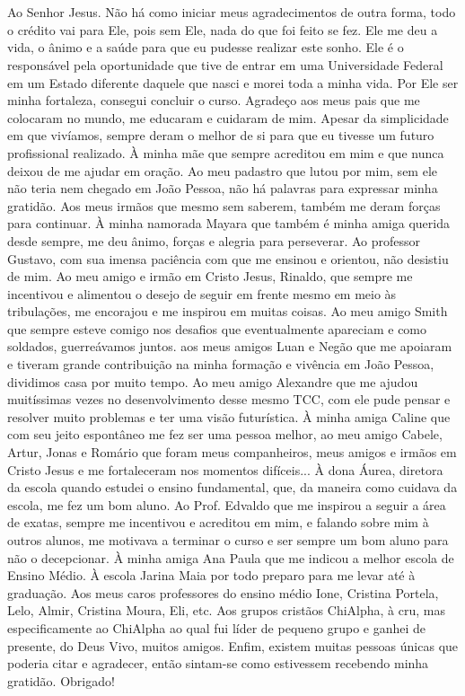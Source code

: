 
\section*{}

Ao Senhor Jesus. Não há como iniciar meus agradecimentos de outra forma, todo o crédito vai para Ele, pois sem Ele, nada do que foi feito se fez. Ele me deu a vida, o ânimo e a saúde para que eu pudesse realizar este sonho. Ele é o responsável pela oportunidade que tive de entrar em uma Universidade Federal em um Estado diferente daquele que nasci e morei toda a minha vida. Por Ele ser minha fortaleza, consegui concluir o curso.
Agradeço aos meus pais que me colocaram no mundo, me educaram e cuidaram de mim. Apesar da simplicidade em que vivíamos, sempre deram o melhor de si para que eu tivesse um futuro profissional realizado. À minha mãe que sempre acreditou em mim e que nunca deixou de me ajudar em oração. Ao meu padastro que lutou por mim, sem ele não teria nem chegado em João Pessoa, não há palavras para expressar minha gratidão. Aos meus irmãos que mesmo sem saberem, também me deram forças para continuar. À minha namorada Mayara que também é minha amiga querida desde sempre, me deu ânimo, forças e alegria para perseverar.
Ao professor Gustavo, com sua imensa paciência com que me ensinou e orientou, não desistiu de mim.
Ao meu amigo e irmão em Cristo Jesus, Rinaldo, que sempre me incentivou e alimentou o desejo de seguir em frente mesmo em meio às tribulações, me encorajou e me inspirou em muitas coisas.
Ao meu amigo Smith que sempre esteve comigo nos desafios que eventualmente apareciam e como soldados, guerreávamos juntos.
aos meus amigos Luan e Negão que me apoiaram e tiveram grande contribuição na minha formação e vivência em João Pessoa, dividimos casa por muito tempo.
Ao meu amigo Alexandre que me ajudou muitíssimas vezes no desenvolvimento desse mesmo TCC, com ele pude pensar e resolver muito problemas e ter uma visão futurística.
À minha amiga Caline que com seu jeito espontâneo me fez ser uma pessoa melhor, ao meu amigo Cabele, Artur, Jonas e Romário que foram meus companheiros, meus amigos e irmãos em Cristo Jesus e me fortaleceram nos momentos difíceis...
À dona Áurea, diretora da escola quando estudei o ensino fundamental, que, da maneira como cuidava da escola, me fez um bom aluno.
Ao Prof. Edvaldo que me inspirou a seguir a área de exatas, sempre me incentivou e acreditou em mim, e falando sobre mim à outros alunos, me motivava a terminar o curso e ser sempre um bom aluno para não o decepcionar. À minha amiga Ana Paula que me indicou a melhor escola de Ensino Médio. À escola Jarina Maia por todo preparo para me levar até à graduação. Aos meus caros professores do ensino médio Ione, Cristina Portela, Lelo, Almir, Cristina Moura, Eli, etc.
Aos grupos cristãos ChiAlpha, à cru, mas especificamente ao ChiAlpha ao qual fui líder de pequeno grupo e ganhei de presente, do Deus Vivo, muitos amigos.
Enfim, existem muitas pessoas únicas que poderia citar e agradecer, então sintam-se como estivessem recebendo minha gratidão. Obrigado!